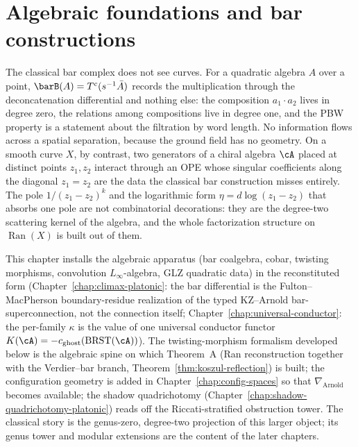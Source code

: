 \chapter{Algebraic foundations and bar constructions}\label{ch:algebraic-foundations}

The classical bar complex does not see curves. For a quadratic
algebra $A$ over a point, $\barB(A) = T^c(s^{-1}\bar{A})$ records
the multiplication through the deconcatenation differential and
nothing else: the composition $a_1 \cdot a_2$ lives in degree
zero, the relations among compositions live in degree one, and
the PBW property is a statement about the filtration by word
length. No information flows across a spatial separation,
because the ground field has no geometry. On a smooth curve $X$,
by contrast, two generators of a chiral algebra $\cA$ placed at
distinct points $z_1, z_2$ interact through an OPE whose
singular coefficients along the diagonal $z_1 = z_2$ are the data
the classical bar construction misses entirely. The pole
$1/(z_1 - z_2)^k$ and the logarithmic form
$\eta = d\log(z_1 - z_2)$ that absorbs one pole are not
combinatorial decorations: they are the degree-two scattering
kernel of the algebra, and the whole factorization structure on
$\operatorname{Ran}(X)$ is built out of them.\label{rem:algebraic-foundations-hms}

This chapter installs the algebraic apparatus (bar coalgebra,
cobar, twisting morphisms, convolution $L_\infty$-algebra, GLZ
quadratic data) in the reconstituted form
(Chapter~\ref{chap:climax-platonic}: the bar differential is the
Fulton--MacPherson boundary-residue realization of the typed
KZ--Arnold bar-superconnection, not the connection itself;
Chapter~\ref{chap:universal-conductor}: the per-family $\kappa$
is the value of one universal conductor functor
$K(\cA) = -c_{\mathrm{ghost}}(\mathrm{BRST}(\cA))$). The
twisting-morphism formalism developed below is the algebraic
spine on which Theorem~A
(Ran reconstruction together with the Verdier--bar branch,
Theorem~\ref{thm:koszul-reflection}) is built; the configuration
geometry is added in Chapter~\ref{chap:config-spaces} so that
$\nabla_{\mathrm{Arnold}}$ becomes available; the shadow
quadrichotomy
(Chapter~\ref{chap:shadow-quadrichotomy-platonic}) reads off the
Riccati-stratified obstruction tower. The classical story is the
genus-zero, degree-two projection of this larger object; its
genus tower and modular extensions are the content of the later
chapters.

